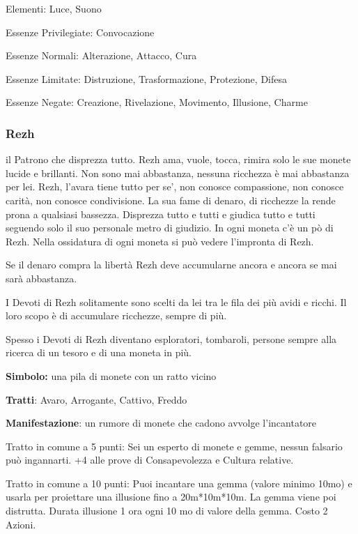 \documentclass[a4paper,11pt,twoside,openany]{book}
\begin{document}
{\bigskip

Elementi: Luce, Suono

\bigskip

Essenze Privilegiate: Convocazione

Essenze Normali: Alterazione, Attacco, Cura

Essenze Limitate: Distruzione, Trasformazione, Protezione, Difesa

Essenze Negate: Creazione, Rivelazione, Movimento, Illusione, Charme

\subsubsection{Rezh}

\label{rezh}

il Patrono che disprezza tutto. Rezh ama, vuole, tocca, rimira solo le sue monete lucide e brillanti. Non sono mai abbastanza, nessuna ricchezza è mai abbastanza per lei. Rezh, l'avara tiene tutto per se', non conosce compassione, non conosce carità, non conosce condivisione. La sua fame di denaro, di ricchezze la rende prona a qualsiasi bassezza. Disprezza tutto e tutti e giudica tutto e tutti seguendo solo il suo personale metro di giudizio. In ogni moneta c'è un pò di Rezh. Nella ossidatura di ogni moneta si può vedere l'impronta di Rezh.

Se il denaro compra la libertà Rezh deve accumularne ancora e ancora se mai sarà abbastanza.

I Devoti di Rezh solitamente sono scelti da lei tra le fila dei più avidi e ricchi. Il loro scopo è di accumulare ricchezze, sempre di più.

Spesso i Devoti di Rezh diventano esploratori, tombaroli, persone sempre alla ricerca di un tesoro e di una moneta in più.

\textbf{Simbolo:} una pila di monete con un ratto vicino

\textbf{Tratti}: Avaro, Arrogante, Cattivo, Freddo

\textbf{Manifestazione}: un rumore di monete che cadono avvolge l'incantatore

\bigskip

Tratto in comune a 5 punti: Sei un esperto di monete e gemme, nessun falsario può ingannarti. +4 alle prove di Consapevolezza e Cultura relative.

Tratto in comune a 10 punti: Puoi incantare una gemma (valore minimo 10mo) e usarla per proiettare una illusione fino a 20m{*}10m{*}10m. La gemma viene poi distrutta. Durata illusione 1 ora ogni 10 mo di valore della gemma. Costo 2 Azioni.

}
\end{document}
